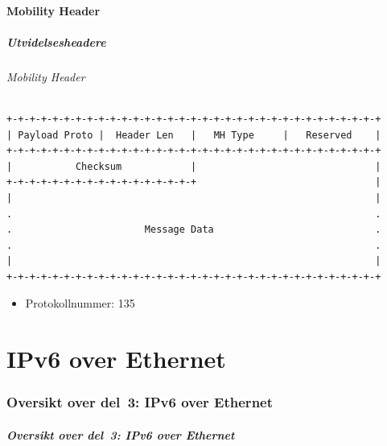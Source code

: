 \subsection{Mobility Header}
\begin{frame}[fragile]%
  \frametitle{Utvidelsesheadere}
  \framesubtitle{Mobility Header}
  \pause
\begin{Verbatim}[fontsize=\tiny]
+-+-+-+-+-+-+-+-+-+-+-+-+-+-+-+-+-+-+-+-+-+-+-+-+-+-+-+-+-+-+-+-+
| Payload Proto |  Header Len   |   MH Type     |   Reserved    |
+-+-+-+-+-+-+-+-+-+-+-+-+-+-+-+-+-+-+-+-+-+-+-+-+-+-+-+-+-+-+-+-+
|           Checksum            |                               |
+-+-+-+-+-+-+-+-+-+-+-+-+-+-+-+-+                               |
|                                                               |
.                                                               .
.                       Message Data                            .
.                                                               .
|                                                               |
+-+-+-+-+-+-+-+-+-+-+-+-+-+-+-+-+-+-+-+-+-+-+-+-+-+-+-+-+-+-+-+-+
\end{Verbatim}

  \pause
  \begin{itemize}[<+->]
  \item Protokollnummer: 135
  \end{itemize}
\end{frame}

\part{IPv6 over Ethernet}

\begin{frame}
  \partpage
\end{frame}

\section*{Oversikt over del~3: IPv6 over Ethernet}
\begin{frame}[allowframebreaks]
  \frametitle{Oversikt over del~3: IPv6 over Ethernet}
    \tableofcontents%
\end{frame}

